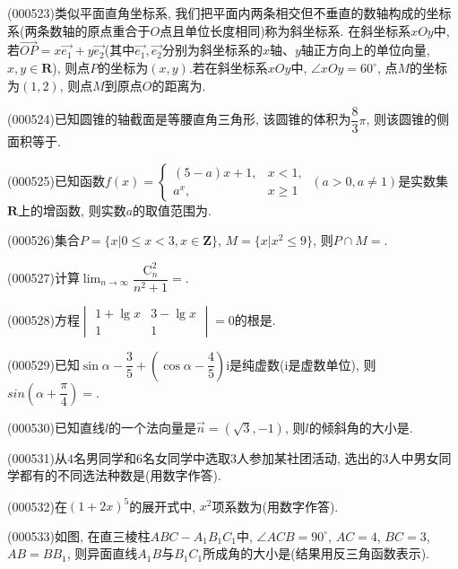 \item (000523)类似平面直角坐标系, 我们把平面内两条相交但不垂直的数轴构成的坐标系(两条数轴的原点重合于$O$点且单位长度相同)称为斜坐标系. 在斜坐标系$xOy$中, 若$\overrightarrow{OP}=x\overrightarrow{e_1}+y\overrightarrow{e_2}$(其中$\overrightarrow{e_1},\overrightarrow{e_2}$分别为斜坐标系的$x$轴、$y$轴正方向上的单位向量, $x,y\in \mathbf{R}$), 则点$P$的坐标为$(x,y)$.若在斜坐标系$xOy$中, $\angle xOy=60^\circ$, 点$M$的坐标为$(1,2)$, 则点$M$到原点$O$的距离为.
\item (000524)已知圆锥的轴截面是等腰直角三角形, 该圆锥的体积为$\dfrac83\pi$, 则该圆锥的侧面积等于.
\item (000525)已知函数$f(x)=\begin{cases} (5-a)x+1, & x<1, \\ a^x, & x\ge 1\end{cases} \ (a>0,a\ne 1)$是实数集$\mathbf{R}$上的增函数, 则实数$a$的取值范围为.
\item (000526)集合$P=\{x|0 \le x<3, x\in \mathbf{Z}\}$, $M=\{x|x^2 \le 9\}$, 则$P\cap M=$.
\item (000527)计算$\displaystyle\lim_{n\to\infty}\dfrac{\mathrm{C}_n^2}{n^2+1}=$.
\item (000528)方程$\begin{vmatrix} 1+\lg x & 3-\lg x  \\   1 & 1  \end{vmatrix}=0$的根是.
\item (000529)已知$\sin \alpha -\dfrac35+(\cos \alpha -\dfrac45)\mathrm{i}$是纯虚数($\mathrm{i}$是虚数单位), 则$sin(\alpha +\dfrac{\pi}4)=$.
\item (000530)已知直线$l$的一个法向量是$\overrightarrow{n}=(\sqrt3,-1)$, 则$l$的倾斜角的大小是.
\item (000531)从$4$名男同学和$6$名女同学中选取$3$人参加某社团活动, 选出的$3$人中男女同学都有的不同选法种数是(用数字作答).
\item (000532)在$(1+2x)^5$的展开式中, $x^2$项系数为(用数字作答).
\item (000533)如图, 在直三棱柱$ABC-A_1B_1C_1$中, $\angle ACB=90^\circ$, $AC=4$, $BC=3$, $AB=BB_1$, 则异面直线$A_1B$与$B_1C_1$所成角的大小是(结果用反三角函数表示).
\begin{center}
\end{center}
